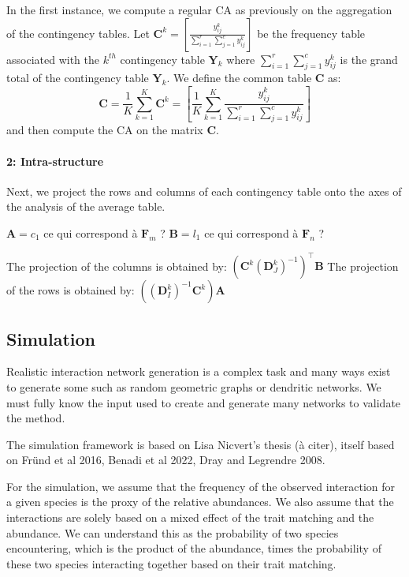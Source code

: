 In the first instance, we compute a regular CA as previously on the aggregation of the contingency tables.
Let $\mathbf{C}^k = \left[ \frac{y_{ij}^k}{\sum_{i=1}^{r} \sum_{j=1}^{c} y_{ij}^k} \right]$ be the frequency table associated with the $k^{th}$ contingency table $\mathbf{Y}_k$ where $\sum_{i=1}^{r} \sum_{j=1}^{c} y_{ij}^k$ is the grand total of the contingency table $\mathbf{Y}_k$.
We define the common table $\mathbf{C}$ as:
$$
    \mathbf{C} = \frac{1}{K} \sum_{k=1}^K \mathbf{C}^k = \left[ \frac{1}{K}\sum_{k=1}^{K}\frac{y_{ij}^k}{\sum_{i=1}^{r} \sum_{j=1}^{c} y_{ij}^k} \right]
$$
and then compute the CA on the matrix $\mathbf{C}$.

\paragraph{2: Intra-structure}

Next, we project the rows and columns of each contingency table onto the axes of the analysis of the average table.

$\mathbf{A} = c_1$ ce qui correspond à $\mathbf{F}_m$ ?
$\mathbf{B} = l_1$ ce qui correspond à $\mathbf{F}_n$ ?

The  projection of the columns is obtained by: $\left( \mathbf{C}^k (\mathbf{D}_J^k)^{-1} \right)^\intercal\mathbf{B}$
The projection of the rows is obtained by: $\left( (\mathbf{D}_I^k)^{-1}\mathbf{C}^k \right) \mathbf{A}$



\subsection{Simulation}

Realistic interaction network generation is a complex task and many ways exist to generate some such as random geometric graphs or dendritic networks. We must fully know the input used to create and generate many networks to validate the method.

The simulation framework is based on Lisa Nicvert's thesis (à citer), itself based on Fründ et al 2016, Benadi et al 2022, Dray and Legrendre 2008.

For the simulation, we assume that the frequency of the observed interaction for a given species is  the proxy of the relative abundances. We also assume that the interactions are solely based on a mixed effect of the trait matching and the abundance. We can understand this as the probability of two species encountering, which is the product of the abundance, times the probability of these two species interacting together based on their trait matching.

